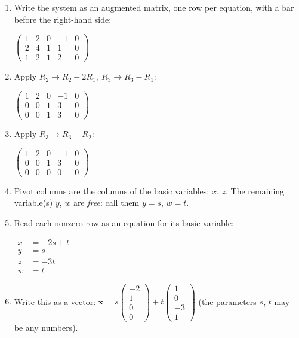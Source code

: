 \documentclass[11pt]{article}
\begin{document}
\begin{tcolorbox}[breakable,colback=ans,colframe=ansb,boxrule=0.5pt,left=4pt,right=4pt,top=2pt,bottom=2pt]\begin{enumerate}[leftmargin=2.2em,itemsep=1pt,topsep=1pt,label=\textbf{Step \arabic*.}]\item Write the system as an augmented matrix, one row per equation, with a bar before the right-hand side:\par\smallskip $\displaystyle \left(\begin{array}{cccc|c}1 & 2 & 0 & -1 & 0 \\ 2 & 4 & 1 & 1 & 0 \\ 1 & 2 & 1 & 2 & 0\end{array}\right)$
\item Apply $R_2\to R_2-2R_1,\ R_3\to R_3-R_1$:\par\smallskip $\displaystyle \left(\begin{array}{cccc|c}1 & 2 & 0 & -1 & 0 \\ 0 & 0 & 1 & 3 & 0 \\ 0 & 0 & 1 & 3 & 0\end{array}\right)$
\item Apply $R_3\to R_3-R_2$:\par\smallskip $\displaystyle \left(\begin{array}{cccc|c}1 & 2 & 0 & -1 & 0 \\ 0 & 0 & 1 & 3 & 0 \\ 0 & 0 & 0 & 0 & 0\end{array}\right)$
\item Pivot columns are the columns of the basic variables: $x$, $z$. The remaining variable(s) $y$, $w$ are \emph{free}: call them $y=s$, $w=t$.
\item Read each nonzero row as an equation for its basic variable:\par\smallskip $\displaystyle\begin{aligned}x&=-2s+t\\ y&=s\\ z&=-3t\\ w&=t\end{aligned}$
\item Write this as a vector: $\displaystyle \mathbf x=s\begin{pmatrix}-2\\1\\0\\0\end{pmatrix}+t\begin{pmatrix}1\\0\\-3\\1\end{pmatrix}$ (the parameters $s$, $t$ may be any numbers).

\end{enumerate}
\end{tcolorbox}
\end{document}
